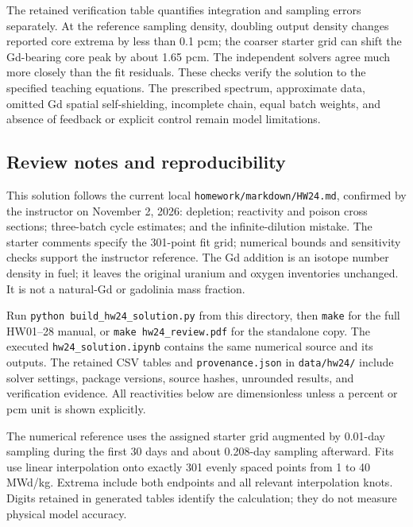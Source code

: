 The retained verification table quantifies integration and sampling
errors separately. At the reference sampling density, doubling output
density changes reported core extrema by less than 0.1 pcm; the coarser
starter grid can shift the Gd-bearing core peak by about 1.65 pcm.
The independent solvers agree much more closely than the fit residuals.
These checks verify the solution to the specified teaching equations.
The prescribed spectrum, approximate data, omitted Gd spatial
self-shielding, incomplete chain, equal batch weights, and absence of
feedback or explicit control remain model limitations.

\subsection*{Review notes and reproducibility}
This solution follows the current local \texttt{homework/markdown/HW24.md},
confirmed by the instructor on November 2, 2026: depletion;
reactivity and poison cross sections; three-batch cycle estimates;
and the infinite-dilution mistake. The starter comments specify the
301-point fit grid; numerical bounds and sensitivity checks support the
instructor reference. The Gd addition is an isotope number density in fuel;
it leaves the original uranium and oxygen inventories unchanged. It is not
a natural-Gd or gadolinia mass fraction.

Run \texttt{python build\_hw24\_solution.py} from this directory, then
\texttt{make} for the full HW01--28 manual, or
\texttt{make hw24\_review.pdf} for the standalone copy. The executed
\texttt{hw24\_solution.ipynb} contains the same numerical source and its
outputs. The retained CSV tables and \texttt{provenance.json} in
\texttt{data/hw24/} include solver settings, package versions, source hashes,
unrounded results, and verification evidence. All reactivities below are
dimensionless unless a percent or pcm unit is shown explicitly.

The numerical reference uses the assigned starter grid augmented by
0.01-day sampling during the first 30 days and about 0.208-day sampling
afterward. Fits use linear interpolation onto exactly 301 evenly spaced
points from 1 to 40 MWd/kg. Extrema include both endpoints and all relevant
interpolation knots. Digits retained in generated tables identify the
calculation; they do not measure physical model accuracy.
